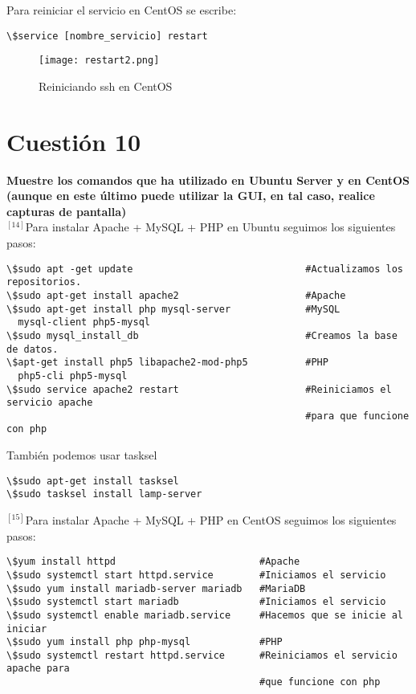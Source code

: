 \documentclass[a4paper, 11pt]{article} %
\begin{document}
Para reiniciar el servicio en CentOS se escribe:
\begin{verbatim}
\$service [nombre_servicio] restart
\end{verbatim}

\begin{figure}[h]
\centering 
\texttt{[image: restart2.png]} 
\caption{Reiniciando ssh en CentOS} 
\vspace{-0.5cm}
\label{contexto:figura} 
\end{figure}

\pagebreak

\section{Cuestión 10}
\textbf{Muestre los comandos que ha utilizado en Ubuntu Server y en CentOS (aunque en este último puede utilizar la GUI, en tal caso, realice capturas de pantalla)}\\

$^{[14]}$Para instalar Apache + MySQL + PHP en Ubuntu seguimos los siguientes pasos:
\begin{verbatim}
\$sudo apt -get update                              #Actualizamos los repositorios.
\$sudo apt-get install apache2                      #Apache
\$sudo apt-get install php mysql-server             #MySQL
  mysql-client php5-mysql
\$sudo mysql_install_db                             #Creamos la base de datos.
\$apt-get install php5 libapache2-mod-php5          #PHP
  php5-cli php5-mysql
\$sudo service apache2 restart                      #Reiniciamos el servicio apache
                                                    #para que funcione con php
\end{verbatim}

También podemos usar tasksel
\begin{verbatim}
\$sudo apt-get install tasksel
\$sudo tasksel install lamp-server
\end{verbatim}

$^{[15]}$Para instalar Apache + MySQL + PHP en CentOS seguimos los siguientes pasos:
\begin{verbatim}
\$yum install httpd                         #Apache
\$sudo systemctl start httpd.service        #Iniciamos el servicio
\$sudo yum install mariadb-server mariadb   #MariaDB
\$sudo systemctl start mariadb              #Iniciamos el servicio  
\$sudo systemctl enable mariadb.service     #Hacemos que se inicie al iniciar
\$sudo yum install php php-mysql            #PHP
\$sudo systemctl restart httpd.service      #Reiniciamos el servicio apache para
                                            #que funcione con php
\end{verbatim}
\end{document}
